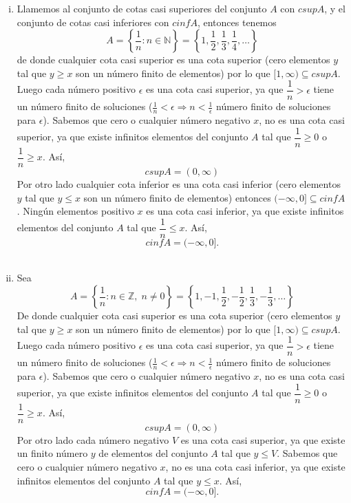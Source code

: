 \begin{enumerate}[\bfseries 1.]
\begin{enumerate}[(a)]
\begin{enumerate}[(i)]
		    \item Llamemos al conjunto de cotas casi superiores del conjunto $A$ con $csup A$, y el conjunto de cotas casi inferiores con $cinf A$, entonces tenemos
		    $$A=\left\{\dfrac{1}{n} : n\in \mathbb{N}\right\}=\left\{1,\dfrac{1}{2},\dfrac{1}{3},\dfrac{1}{4},\ldots\right\}$$
		    de donde cualquier cota casi superior es una cota superior (cero elementos $y$ tal que $y\geq x$ son un número finito de elementos) por lo que $[1,\infty) \subseteq csup A$. Luego cada número positivo $\epsilon$ es una cota casi superior, ya que $\dfrac{1}{n}>\epsilon$ tiene un número finito de soluciones ($\frac{1}{n}< \epsilon \Rightarrow n < \frac{1}{\epsilon}$ número finito de soluciones para $\epsilon$). Sabemos que cero o cualquier número negativo $x$, no es una cota casi superior, ya que existe infinitos elementos del conjunto $A$ tal que $\dfrac{1}{n}\geq 0$ o $\dfrac{1}{n}\geq x$. Así,
		    $$csup A = (0,\infty)$$
		    Por otro lado cualquier cota inferior es una cota casi inferior (cero elementos $y$ tal que $y\leq x$ son un número finito de elementos) entonces $(-\infty,0]\subseteq cinf A$. Ningún elementos positivo $x$ es una cota casi inferior, ya que existe infinitos elementos del conjunto $A$ tal que $\dfrac{1}{n}\leq x$. Así,
		    $$cinf A = (-\infty,0].$$\\

		    \item Sea
		    $$A=\left\{\dfrac{1}{n} : n\in \mathbb{Z},\; n\neq 0\right\} = \left\{1,-1,\dfrac{1}{2},-\dfrac{1}{2},\dfrac{1}{3},-\dfrac{1}{3},\ldots\right\}$$
		    De donde cualquier cota casi superior es una cota superior (cero elementos $y$ tal que $y\geq x$ son un número finito de elementos) por lo que $[1,\infty) \subseteq csup A$. Luego cada número positivo $\epsilon$ es una cota casi superior, ya que $\dfrac{1}{n}>\epsilon$ tiene un número finito de soluciones ($\frac{1}{n}< \epsilon \Rightarrow n < \frac{1}{\epsilon}$ número finito de soluciones para $\epsilon$). Sabemos que cero o cualquier número negativo $x$, no es una cota casi superior, ya que existe infinitos elementos del conjunto $A$ tal que $\dfrac{1}{n}\geq 0$ o $\dfrac{1}{n}\geq x$. Así,
		    $$csup A = (0,\infty)$$
		    Por otro lado cada número negativo $V$ es una cota casi superior, ya que existe un finito número $y$ de elementos del conjunto $A$ tal que $y\leq V$. Sabemos que cero o cualquier número negativo $x$, no es una cota casi inferior, ya que existe infinitos elementos del conjunto $A$ tal que $y\leq x$. Así,
		    $$cinf A = (-\infty,0].$$\\


\end{enumerate}
\end{enumerate}
\end{enumerate}
